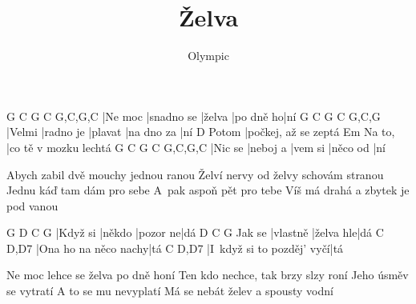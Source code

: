 \documentclass{song}
\title{Želva}
\author{Olympic}
\begin{document}
\strophe
G       C          G      C         G,C,G,C
|Ne moc |snadno se |želva |po dně ho|ní
G      C         G       C          G,C,G
|Velmi |radno je |plavat |na dno za |ní
      D
Potom |počkej, až se zeptá
       Em
Na to, |co tě v mozku lechtá
G       C        G       C        G,C,G,C
|Nic se |neboj a |vem si |něco od |ní
\endstrophe

\strophe*
Abych zabil dvě mouchy jednou ranou
Želví nervy od želvy schovám stranou
Jednu káď tam dám pro sebe
A~pak aspoň pět pro tebe
Víš má drahá a zbytek je pod vanou
\endstrophe

G        D      C        G
|Když si |někdo |pozor ne|dá
       D        C         G
Jak se |vlastně |želva hle|dá
C                    D,D7
|Ona ho na něco nachy|tá
C                         D,D7
|I~když si to pozděj' vyčí|tá
\endstrophe

\strophe*
Ne moc lehce se želva po dně honí
Ten kdo nechce, tak brzy slzy roní
Jeho úsměv se vytratí
A to se mu nevyplatí
Má se nebát želev a spousty vodní
\endstrophe
\end{document}
